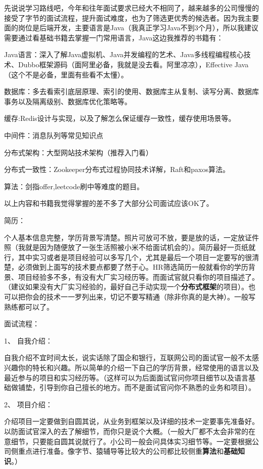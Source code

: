 \documentclass[UTF8]{ctexart}
\begin{document}
先说说学习路线吧，今年和往年面试要求已经大不相同了，越来越多的公司慢慢的接受了字节的面试流程，提升面试难度，也为了筛选更优秀的候选者。因为我主要面的岗位是后端开发，主要语言是Java（我真正学习Java不到3个月），所以我建议需要通过看基础书籍去掌握一门常用语言，Java这边我推荐的书籍有：

Java语言：深入了解Java虚拟机、Java并发编程的艺术、Java多线程编程核心技术、Dubbo框架源码（面阿里必备，我就是没去看。阿里凉凉），Effective Java（这个不是必备，里面有些看不太懂）。

数据库：多去看索引底层原理、索引的使用、数据库主从复制、读写分离、数据库事务以及隔离级别、数据库优化策略等。

缓存:Redis设计与实现，以及了解怎么保证缓存一致性，缓存使用场景等。

中间件：消息队列等常见知识点

分布式架构：大型网站技术架构（推荐入门看）

分布式一致性：Zookeeper分布式过程协同技术详解，Raft和paxos算法。

算法：剑指offer,leetcode刷中等难度的题目。

以上内容和书籍我觉得掌握的差不多了大部分公司面试应该OK了。

简历：

个人基本信息完整，学历背景写清楚。照片可放可不放，要是放的话，一定放证件照（我就是因为随便放了一张生活照被小米不给面试机会的）。简历最好一页纸就行，其中实习或者是项目经验可以多写几个，尤其是最后一个项目一定要写的很清楚，必须做到上面写的技术要点都要了然于心。HR筛选简历一般就看你的学历背景、项目经验多不多，有没有大厂实习经历等。而面试官就只看你的项目描述了。（建议如果没有大厂实习经验的，最好自己手动实现一个\textbf{分布式框架}的项目）。也可以把你会的技术一一罗列出来，切记不要写精通（除非你真的是大神）。一般写熟练都可以了。

面试流程：

1、 自我介绍：

自我介绍不宜时间太长，说实话除了国企和银行，互联网公司的面试官一般不太感兴趣你的特长和兴趣。所以简单的介绍一下自己的学历背景，经常使用的语言以及最近参与的项目和实习经历等。（这样可以为后面面试官问你项目细节以及语言基础做铺垫，引导到你自己擅长的地方。而不是面试官问你不熟悉的业务和项目）。

2、 项目介绍：

介绍项目一定要做到自圆其说，从业务到框架以及详细的技术一定要事先准备好。以防面试官深入的去了解细节，而你只是说个大概。（一般大厂都不太会非常的在意细节，只要能自圆其说就行了。小公司一般会问具体实习细节等。一定要根据公司侧重点进行准备。像字节、猿辅导等比较大的公司都比较侧重\textbf{算法}和\textbf{基础知识}。）
\end{document}

